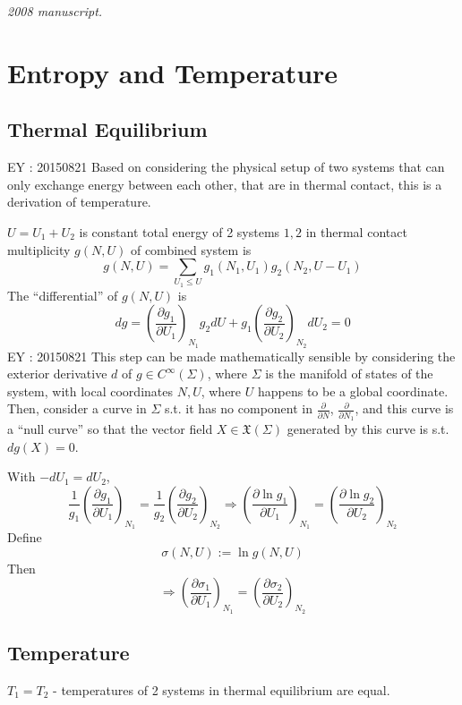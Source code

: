 \noindent\textit{2008 manuscript.}

\section{Entropy and Temperature}

\subsection*{Thermal Equilibrium}

EY : 20150821 Based on considering the physical setup of two systems that can only exchange energy between each other, that are in thermal contact, this is a derivation of temperature.

$U = U_1 + U_2$ is constant total energy of 2 systems $1,2$ in thermal contact \\
multiplicity $g(N,U)$ of combined system is 
\[
g(N,U) = \sum_{U_1 \leq U} g_1(N_1,U_1)g_2(N_2,U-U_1)
\]
The ``differential'' of $g(N,U)$ is 
\[
dg = \left( \frac{\partial g_1}{ \partial U_1 } \right)_{N_1} g_2 dU + g_1\left( \frac{\partial g_2 }{ \partial U_2 } \right)_{N_2} dU_2 = 0 
\]
EY : 20150821 This step can be made mathematically sensible by considering the exterior derivative $d$ of $g \in C^{\infty}(\Sigma)$, where $\Sigma$ is the manifold of states of the system, with local coordinates $N,U$, where $U$ happens to be a global coordinate. Then, consider a curve in $\Sigma$ s.t. it has no component in $\frac{\partial}{ \partial N}$, $\frac{\partial}{ \partial N_1}$, and this curve is a ``null curve'' so that the vector field $X\in \mathfrak{X}(\Sigma)$ generated by this curve is s.t. $dg(X)=0$.  

With $-dU_1 = dU_2$,
\[
\frac{1}{g_1} \left( \frac{\partial g_1}{ \partial U_1}\right)_{N_1} = \frac{1}{g_2} \left( \frac{\partial g_2}{ \partial U_2} \right)_{N_2} \Longrightarrow \left( \frac{ \partial \ln{g_1} }{ \partial U_1} \right)_{N_1} = \left( \frac{ \partial \ln{g_2}}{ \partial U_2} \right)_{N_2}
\]
Define
\[
\sigma(N,U) := \ln{ g(N,U)}
\]
Then
\[
\Longrightarrow \left( \frac{ \partial \sigma_1}{ \partial U_1} \right)_{N_1} = \left( \frac{ \partial \sigma_2}{ \partial U_2} \right)_{N_2}
\]



\subsection*{Temperature}

$T_1=T_2$ - temperatures of 2 systems in thermal equilibrium are equal.  

